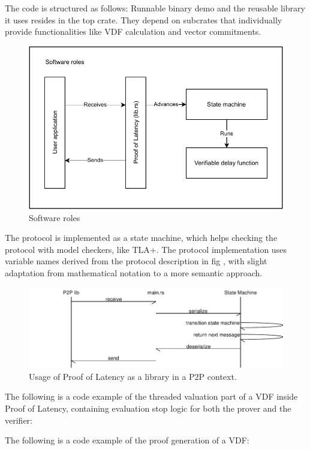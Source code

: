 The code is structured as follows: Runnable binary demo and the reusable library it uses resides in the top crate. They depend on subcrates that individually provide functionalities like VDF calculation and vector commitments.

\begin{figure}
	\includegraphics[width=\textwidth]{pictures/PoL_software_roles.pdf}
	\caption{Software roles}
	\label{software_roles}
\end{figure}

The protocol is implemented as a state machine, which helps checking the protocol with model checkers, like TLA+. %
 The protocol implementation uses variable names derived from the protocol description in fig %
 , with slight adaptation from mathematical notation to a more semantic approach.

\begin{figure}
	\includegraphics[width=\textwidth]{pictures/message_flow-eps-converted-to.pdf}
	\caption{Usage of Proof of Latency as a library in a P2P context.}
	\label{message_flow}
\end{figure}

The following is a code example of the threaded valuation part of a VDF inside Proof of Latency, containing evaluation stop logic for both the prover and the verifier:

The following is a code example of the proof generation of a VDF:


